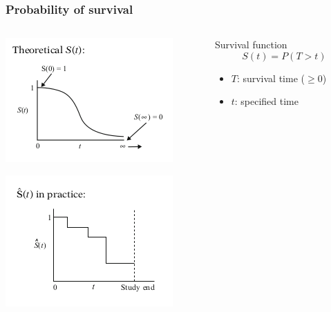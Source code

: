 \documentclass{beamer} \usepackage{amsmath,amsthm}
\begin{document}
\begin{frame}
  \frametitle{Probability of survival}

  \begin{columns}
    \begin{column}{0.5\textwidth} 
      \includegraphics[height = 0.4\textheight, width = \textwidth, keepaspectratio = true]{figure/ideal}

      \includegraphics[height = 0.4\textheight, width = \textwidth, keepaspectratio = true]{figure/prac}

      \tiny{}
    \end{column}
    \begin{column}{0.5\textwidth}
      \begin{block}{Survival function}
        \[
          S(t) = P(T > t)
        \]

        \begin{itemize}
          \item \(T\): survival time (\(\geq 0\))
          \item \(t\): specified time 
        \end{itemize}
      \end{block}
    \end{column}
  \end{columns}
\end{frame}
\end{document}
